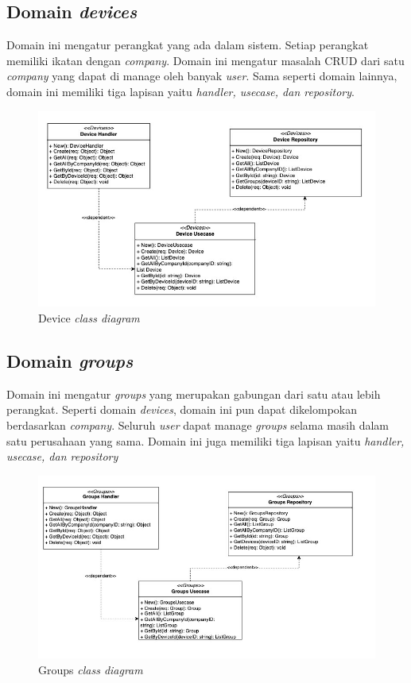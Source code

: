 \subsection{Domain \textit{devices}}

Domain ini mengatur perangkat yang ada dalam sistem. Setiap perangkat memiliki ikatan dengan \textit{company}. Domain ini mengatur masalah CRUD dari satu \textit{company} yang dapat di manage oleh banyak \textit{user}. Sama seperti domain lainnya, domain ini memiliki tiga lapisan yaitu \textit{handler, usecase, dan repository}.

\begin{figure}[ht]
  \centering
  \includegraphics[width=1\textwidth]{resources/chapter-3/class/device-class-diagram.jpg}
  \caption{Device \textit{class diagram}}
  \label{fig:device-class-diagram}
\end{figure}

\subsection{Domain \textit{groups}}

Domain ini mengatur \textit{groups} yang merupakan gabungan dari satu atau lebih perangkat. Seperti domain \textit{devices}, domain ini pun dapat dikelompokan berdasarkan \textit{company}. Seluruh \textit{user} dapat manage \textit{groups} selama masih dalam satu perusahaan yang sama. Domain ini juga memiliki tiga lapisan yaitu \textit{handler, usecase, dan repository}

\begin{figure}[ht]
  \centering
  \includegraphics[width=1\textwidth]{resources/chapter-3/class/groups-class-diagram.jpg}
  \caption{Groups \textit{class diagram}}
  \label{fig:groups-class-diagram}
\end{figure}

